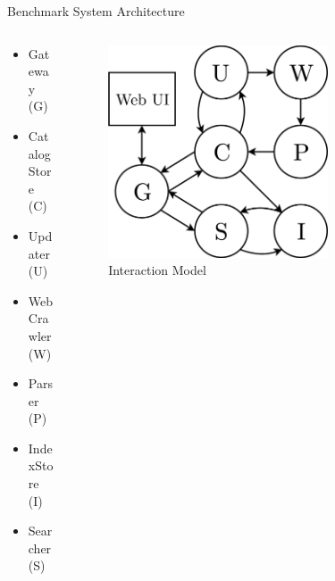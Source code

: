 \documentclass{beamer}
\begin{document}
\begin{frame}{Benchmark System Architecture}

\begin{columns}
  \begin{column}{0.47\textwidth}
    \begin{itemize}
      \item Gateway (G) 
      \item CatalogStore (C)
      \item Updater (U)
      \item Web Crawler (W)
      \item Parser (P)
      \item IndexStore (I)
      \item Searcher (S)
    \end{itemize}
  \end{column}
  \begin{column}{0.5\textwidth}
    \begin{figure} 
      \includegraphics[width=0.7\textwidth]{graphics/interaction-model.png} 
      \caption{Interaction Model}
    \end{figure}
  \end{column}
\end{columns}

\end{frame}

\end{document}
